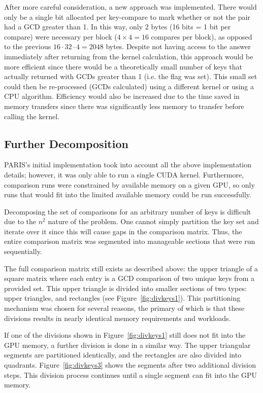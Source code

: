 \documentclass[smallextended]{svjour3}       %
\begin{document}
After more careful consideration, a new approach was implemented. There would 
only be a single bit allocated per key-compare to mark whether or not the pair 
had a GCD greater than 1. In this way, only 2 bytes (16 bits = 1 bit per 
compare) were necessary per block ($4\times4 = 16$ compares per block), as 
opposed to the previous $16 \cdot 32 \cdot 4 = 2048$ bytes. Despite not having access 
to the answer immediately after returning from the kernel calculation, this 
approach would be more efficient since there would be a theoretically small 
number of keys that actually returned with GCDs greater than 1 (i.e. the flag 
was set). This small set could then be re-processed (GCDs calculated) using a 
different kernel or using a CPU algorithm. Efficiency would also be increased 
due to the time saved in memory transfers since there was significantly less 
memory to transfer before calling the kernel.

\subsection{Further Decomposition}
\label{subsec:furtherdecomp}
PARIS's initial implementation \citep{scharfglass2012breaking} took into account all the above implementation details; however, it was only able to run a single CUDA kernel. Furthermore, comparison runs were constrained by available memory on a given GPU, so only runs that would fit into the limited available memory could be run successfully.

Decomposing the set of comparisons for an arbitrary number of keys is difficult due to the $n^2$ nature of the problem. One cannot simply partition the key set and iterate over it since this will cause gaps in the comparison matrix. Thus, the entire comparison matrix was segmented into manageable sections that were run sequentially.

The full comparison matrix still exists as described above: the upper triangle of a square matrix where each entry is a GCD comparison of two unique keys from a provided set. This upper triangle is divided into smaller sections of two types: upper triangles, and rectangles (see Figure~\ref{fig:divkeys1}). This partitioning mechanism was chosen for several reasons, the primary of which is that these divisions results in nearly identical memory requirements and workloads. 

If one of the divisions shown in Figure~\ref{fig:divkeys1} still does not fit into the GPU memory, a further division is done in a similar way. The upper triangular segments are partitioned identically, and the rectangles are also divided into quadrants. Figure~\ref{fig:divkeys3} shows the segments after two additional division steps. This division process continues until a single segment can fit into the GPU memory.
\end{document}
